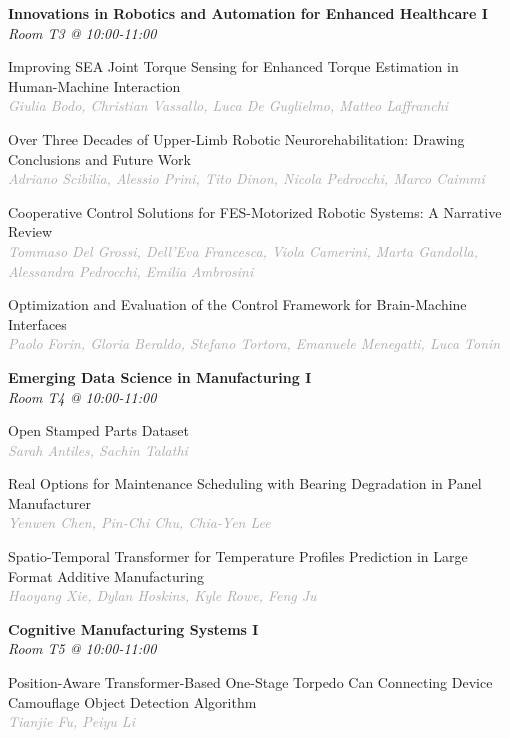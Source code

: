 \begin{multicols*}{2}
\normalsize \textbf{Innovations in Robotics and Automation for Enhanced Healthcare I}\\
\small \textit{Room T3 @ 10:00-11:00}

\small Improving SEA Joint Torque Sensing for Enhanced Torque Estimation in Human-Machine Interaction\\ 
\footnotesize \textcolor{darkgray}{\textit{Giulia Bodo, Christian  Vassallo, Luca  De Guglielmo, Matteo  Laffranchi}}

\small Over Three Decades of Upper-Limb Robotic Neurorehabilitation: Drawing Conclusions and Future Work\\ 
\footnotesize \textcolor{darkgray}{\textit{Adriano Scibilia, Alessio  Prini, Tito  Dinon, Nicola  Pedrocchi, Marco  Caimmi}}

\small Cooperative Control Solutions for FES-Motorized Robotic Systems: A Narrative Review\\ 
\footnotesize \textcolor{darkgray}{\textit{Tommaso Del Grossi, Dell'Eva  Francesca, Viola  Camerini, Marta  Gandolla, Alessandra  Pedrocchi, Emilia  Ambrosini}}

\small Optimization and Evaluation of the Control Framework for Brain-Machine Interfaces\\ 
\footnotesize \textcolor{darkgray}{\textit{Paolo Forin, Gloria  Beraldo, Stefano  Tortora, Emanuele  Menegatti, Luca  Tonin}}

\normalsize \textbf{Emerging Data Science in Manufacturing I}\\
\small \textit{Room T4 @ 10:00-11:00}

\small Open Stamped Parts Dataset\\ 
\footnotesize \textcolor{darkgray}{\textit{Sarah Antiles, Sachin  Talathi}}

\small Real Options for Maintenance Scheduling with Bearing Degradation in Panel Manufacturer\\ 
\footnotesize \textcolor{darkgray}{\textit{Yenwen Chen, Pin-Chi  Chu, Chia-Yen  Lee}}

\small Spatio-Temporal Transformer for Temperature Profiles Prediction in Large Format Additive Manufacturing\\ 
\footnotesize \textcolor{darkgray}{\textit{Haoyang Xie, Dylan  Hoskins, Kyle  Rowe, Feng  Ju}}

\normalsize \textbf{Cognitive Manufacturing Systems I}\\
\small \textit{Room T5 @ 10:00-11:00}

\small Position-Aware Transformer-Based One-Stage Torpedo Can Connecting Device Camouflage Object Detection Algorithm\\ 
\footnotesize \textcolor{darkgray}{\textit{Tianjie Fu, Peiyu  Li}}


\end{multicols*}
